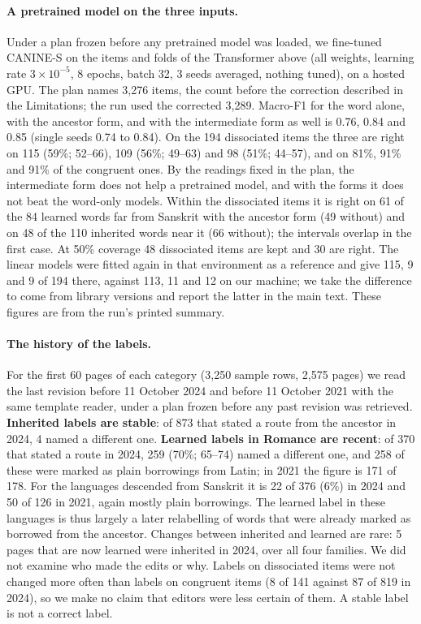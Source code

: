 \documentclass[11pt]{article}
\begin{document}
\paragraph{A pretrained model on the three inputs.} Under a plan frozen before any pretrained model was loaded, we fine-tuned CANINE-S \citep{clark2022canine} on the items and folds of the Transformer above (all weights, learning rate $3\times10^{-5}$, 8 epochs, batch 32, 3 seeds averaged, nothing tuned), on a hosted GPU. The plan names 3,276 items, the count before the correction described in the Limitations; the run used the corrected 3,289. Macro-F1 for the word alone, with the ancestor form, and with the intermediate form as well is 0.76, 0.84 and 0.85 (single seeds 0.74 to 0.84). On the 194 dissociated items the three are right on 115 (59\%; 52--66), 109 (56\%; 49--63) and 98 (51\%; 44--57), and on 81\%, 91\% and 91\% of the congruent ones. By the readings fixed in the plan, the intermediate form does not help a pretrained model, and with the forms it does not beat the word-only models. Within the dissociated items it is right on 61 of the 84 learned words far from Sanskrit with the ancestor form (49 without) and on 48 of the 110 inherited words near it (66 without); the intervals overlap in the first case. At 50\% coverage 48 dissociated items are kept and 30 are right. The linear models were fitted again in that environment as a reference and give 115, 9 and 9 of 194 there, against 113, 11 and 12 on our machine; we take the difference to come from library versions and report the latter in the main text. These figures are from the run's printed summary.

\paragraph{The history of the labels.} For the first 60 pages of each category (3,250 sample rows, 2,575 pages) we read the last revision before 11 October 2024 and before 11 October 2021 with the same template reader, under a plan frozen before any past revision was retrieved. \textbf{Inherited labels are stable}: of 873 that stated a route from the ancestor in 2024, 4 named a different one. \textbf{Learned labels in Romance are recent}: of 370 that stated a route in 2024, 259 (70\%; 65--74) named a different one, and 258 of these were marked as plain borrowings from Latin; in 2021 the figure is 171 of 178. For the languages descended from Sanskrit it is 22 of 376 (6\%) in 2024 and 50 of 126 in 2021, again mostly plain borrowings. The learned label in these languages is thus largely a later relabelling of words that were already marked as borrowed from the ancestor. Changes between inherited and learned are rare: 5 pages that are now learned were inherited in 2024, over all four families. We did not examine who made the edits or why. Labels on dissociated items were not changed more often than labels on congruent items (8 of 141 against 87 of 819 in 2024), so we make no claim that editors were less certain of them. A stable label is not a correct label.
\end{document}

